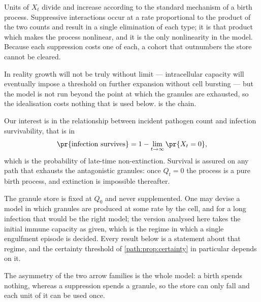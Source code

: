 Units of $X_t$ divide and increase according to the standard mechanism of a
birth process. Suppressive interactions occur at a rate proportional to the
product of the two counts and result in a single elimination of each type;
it is that product which makes the process nonlinear, and it is the only
nonlinearity in the model. Because each suppression costs one of each, a
cohort that outnumbers the store cannot be cleared.

In reality growth will not be truly without limit --- intracellular capacity
will eventually impose a threshold on further expansion without cell
bursting --- but the model is not run beyond the point at which the granules
are exhausted, so the idealisation costs nothing that is used below.
 is the chain.

Our interest is in the relationship between incident pathogen count and
infection survivability, that is in
\begin{equation}
\pr{\text{infection survives}} = 1-\lim_{t\to\infty}\pr{X_t=0},
\label{path:eq:survival}
\end{equation}
which is the probability of late-time non-extinction. Survival is assured on
any path that exhausts the antagonistic granules: once $Q_t=0$ the process is
a pure birth process, and extinction is impossible thereafter.

\begin{remark}[No replenishment]
\label{path:rem:noreplenish}
The granule store is fixed at $Q_0$ and never supplemented. One may devise a
model in which granules are produced at some rate by the cell, and for a
long infection that would be the right model; the version analysed here
takes the initial immune capacity as given, which is the regime in which a
single engulfment episode is decided. Every result below is a statement
about that regime, and the certainty threshold of
\cref{path:prop:certainty} in particular depends on it.
\end{remark}

The asymmetry of the two arrow families is the whole model: a birth spends
nothing, whereas a suppression spends a granule, so the store can only fall
and each unit of it can be used once.

